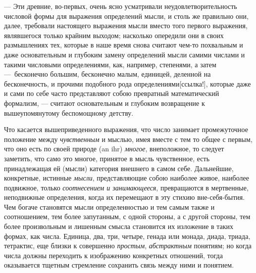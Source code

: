 {— Эти древние, во-первых, очень ясно усматривали неудовлетворительность
числовой формы для выражения определений мысли, и столь же правильно они,
далее, требовали настоящего выражения мысли вместо того первого выражения,
являвшегося только крайним выходом; насколько опередили они в своих
размышлениях тех, которые в наше время снова считают чем-то похвальным и
даже основательным и глубоким замену определений мысли самими числами и
такими числовыми определениями, как, например, степенями, а затем
—~бесконечно большим, бесконечно малым, единицей, деленной на
бесконечность, и прочими подобного рода
определениями[ссылка!], которые даже и сами по
себе часто представляют собою превратный математический формализм, —
считают основательным и глубоким возвращение к вышеупомянутому беспомощному
детству.

Что касается вышеприведенного выражения, что число занимает промежуточное
положение между {\em чувственным} и мыслью, имея вместе
с тем то общее с первым, что оно есть по своей природе (an ihr)
{\em многое}, внеположное, то следует заметить, что
само это многое, принятое в мысль чувственное, есть принадлежащая ей
(мысли) категория внешнего в самом себе. Дальнейшие, конкретные, истинные
{\em мысли}, представляющие собою наиболее живое,
наиболее подвижное, только {\em соотнесением и
занимающееся}, превращаются в мертвенные, неподвижные определения, когда их
перемещают в эту стихию вне-себя-бытия. Чем богаче становятся мысли
определенностью и тем самым также и соотношением, тем более запутанным, с
одной стороны, а с другой стороны, тем более произвольным и лишенным смысла
становится их изложение в таких формах, как числа. Единица, два, три,
четыре, генада или монада, диада, триада, тетрактис, еще близки к
совершенно {\em простым},
{\em абстрактным} понятиям; но когда числа должны
переходить к изображению конкретных отношений, тогда оказывается тщетным
стремление сохранить связь между ними и понятием.

}
